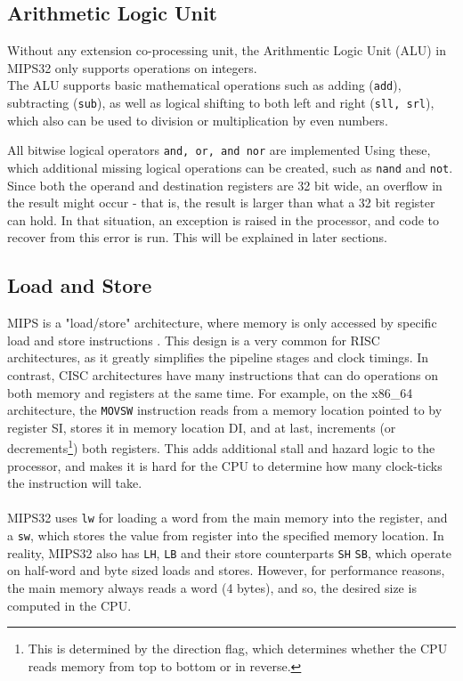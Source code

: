 \subsection{Arithmetic Logic Unit}
Without any extension co-processing unit, the Arithmentic Logic Unit (ALU) in
MIPS32 only supports operations on integers. \\
The ALU supports basic mathematical operations such as adding (\texttt{add}),
subtracting (\texttt{sub}), as well as logical shifting to both left and right
(\texttt{sll, srl}), which also can be used to division or multiplication by
even numbers.

All bitwise logical operators \texttt{and, or, and nor} are implemented Using
these, which additional missing logical operations can be created, such as
\texttt{nand} and \texttt{not}.\\
Since both the operand and destination registers are 32 bit wide, an overflow
in the result might occur - that is, the result is larger than what a 32 bit
register can hold.
In that situation, an exception is raised in the processor, and code to recover
from this error is run\cite{COD5}. This will be explained in later sections.


\subsection{Load and Store}
MIPS is a "load/store" architecture, where memory is only accessed by specific
load and store instructions \cite{flynn1995computer}. This design is a very
common for RISC architectures, as it greatly simplifies the pipeline stages and
clock timings. In contrast, CISC architectures have many instructions that can
do operations on both memory and registers at the same time. For example, on
the x86\_64 architecture, the
\texttt{MOVSW} instruction reads from a memory location pointed to by register
SI, stores it in memory location DI, and at last, increments (or
decrements\footnote{This is determined by the direction flag, which determines
whether the CPU reads memory from top to bottom or in reverse.})
both registers\cite{intelmanual}. This adds additional stall and hazard logic to
the processor, and makes it is hard for the CPU to determine how many
clock-ticks the instruction will take.\\\\
MIPS32 uses \texttt{lw} for loading a word from the main memory into the register,
and a \texttt{sw}, which stores the value from register into the specified
memory location. In reality, MIPS32 also has \texttt{LH}, \texttt{LB} and
their store counterparts \texttt{SH} \texttt{SB}, which operate on half-word
and byte sized loads and stores. However, for performance reasons, the main
memory always reads a word (4 bytes), and so, the desired size is computed in
the CPU.



